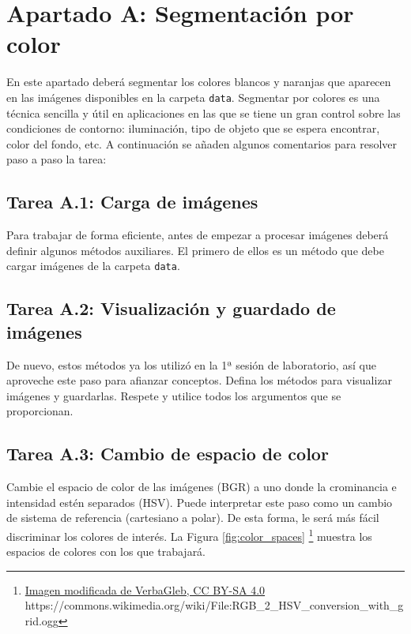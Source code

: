\chapter{Apartado A: \textbf{Segmentación por color}}
\label{chapter:tarea_a}

En este apartado deberá segmentar los colores blancos y naranjas que aparecen en las imágenes disponibles en la carpeta \texttt{data}. Segmentar por colores es una técnica sencilla y útil en aplicaciones en las que se tiene un gran control sobre las condiciones de contorno: iluminación, tipo de objeto que se espera encontrar, color del fondo, etc. A continuación se añaden algunos comentarios para resolver paso a paso la tarea:

\section*{Tarea A.1: Carga de imágenes}
{}

Para trabajar de forma eficiente, antes de empezar a procesar imágenes deberá definir algunos métodos auxiliares. El primero de ellos es un método que debe cargar imágenes de la carpeta \texttt{data}.

\section*{Tarea A.2: Visualización y guardado de imágenes}

De nuevo, estos métodos ya los utilizó en la 1ª sesión de laboratorio, así que aproveche este paso para afianzar conceptos. Defina los métodos para visualizar imágenes y guardarlas. Respete y utilice todos los argumentos que se proporcionan.

\section*{Tarea A.3: Cambio de espacio de color}

Cambie el espacio de color de las imágenes (BGR) a uno donde la crominancia e intensidad estén separados (HSV). Puede interpretar este paso como un cambio de sistema de referencia (cartesiano a polar). De esta forma, le será más fácil discriminar los colores de interés. La Figura \ref{fig:color_spaces} \footnote{ \href{https://commons.wikimedia.org/wiki/File:RGB\_2\_HSV\_conversion\_with\_grid.ogg}{Imagen modificada de VerbaGleb, CC BY-SA 4.0} https://commons.wikimedia.org/wiki/File:RGB\_2\_HSV\_conversion\_with\_grid.ogg} muestra los espacios de colores con los que trabajará.

